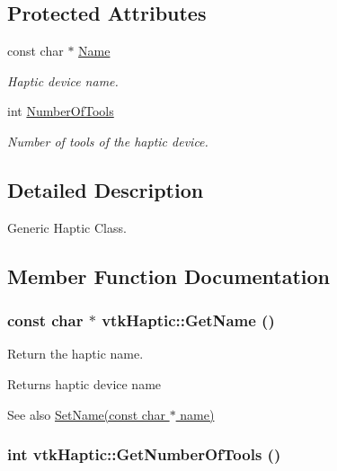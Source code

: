 \subsection*{Protected Attributes}
\begin{DoxyCompactItemize}
\item 
\hypertarget{classvtkHaptic_a219429c7185471e84c9ea33275c0ab32}{
const char $\ast$ \hyperlink{classvtkHaptic_a219429c7185471e84c9ea33275c0ab32}{Name}}
\label{classvtkHaptic_a219429c7185471e84c9ea33275c0ab32}

\begin{DoxyCompactList}\small\item\em Haptic device name. \item\end{DoxyCompactList}\item 
\hypertarget{classvtkHaptic_a4837e3d8ae7cce4cc3ff8851409176bd}{
int \hyperlink{classvtkHaptic_a4837e3d8ae7cce4cc3ff8851409176bd}{NumberOfTools}}
\label{classvtkHaptic_a4837e3d8ae7cce4cc3ff8851409176bd}

\begin{DoxyCompactList}\small\item\em Number of tools of the haptic device. \item\end{DoxyCompactList}\end{DoxyCompactItemize}


\subsection{Detailed Description}
Generic Haptic Class. 

\subsection{Member Function Documentation}
\hypertarget{classvtkHaptic_abdf00bb1f22ee8c984982c4e90c729a5}{
\subsubsection[{GetName}]{\setlength{\rightskip}{0pt plus 5cm}const char $\ast$ vtkHaptic::GetName ()}}
\label{classvtkHaptic_abdf00bb1f22ee8c984982c4e90c729a5}


Return the haptic name. \begin{DoxyReturn}{Returns}
haptic device name 
\end{DoxyReturn}
\begin{DoxySeeAlso}{See also}
\hyperlink{classvtkHaptic_a03c7815125924b8771372879ad367e09}{SetName(const char $\ast$ name)} 
\end{DoxySeeAlso}
\hypertarget{classvtkHaptic_a6572234c6e1448d8244d1ae7ebad4985}{
\subsubsection[{GetNumberOfTools}]{\setlength{\rightskip}{0pt plus 5cm}int vtkHaptic::GetNumberOfTools ()}}
\label{classvtkHaptic_a6572234c6e1448d8244d1ae7ebad4985}


